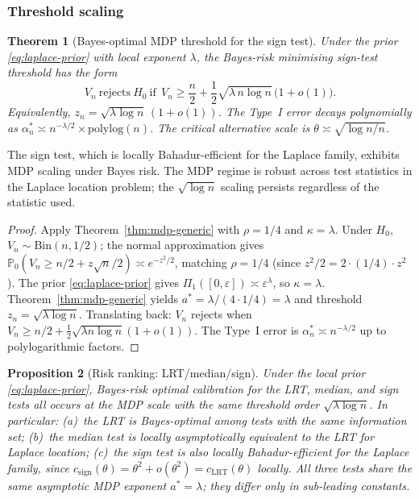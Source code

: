 \documentclass[11pt]{article}
\newcommand{\rhotail}{\rho}  %
\newcommand{\1}{\mathbf{1}}
\newcommand{\PP}{\mathbb{P}}
\theoremstyle{plain}
\newtheorem{theorem}{Theorem}[section]
\newtheorem{proposition}[theorem]{Proposition}
\theoremstyle{definition}
\theoremstyle{remark}
\begin{document}
\subsubsection{Threshold scaling}

\begin{theorem}[Bayes-optimal MDP threshold for the sign test]\label{thm:laplace-sign-threshold}
Under the prior \eqref{eq:laplace-prior} with local exponent $\lambda$, the Bayes-risk minimising sign-test threshold has the form
\begin{equation}\label{eq:laplace-sign-threshold}
  V_n\ \text{rejects}\ H_0\ \text{if}\ \ V_n\ge \frac{n}{2}+\frac{1}{2}\sqrt{\lambda\,n\log n}\,\bigl(1+o(1)\bigr).
\end{equation}
Equivalently, $z_n=\sqrt{\lambda\log n}\,(1+o(1))$.
The Type~I error decays polynomially as $\alpha_n^* \asymp n^{-\lambda/2}\times\mathrm{polylog}(n)$.
The critical alternative scale is $\theta\asymp \sqrt{\log n/n}$.
\end{theorem}

The sign test, which is locally Bahadur-efficient for the Laplace family, exhibits MDP scaling under Bayes risk.
The MDP regime is robust across test statistics in the Laplace location problem; the $\sqrt{\log n}$ scaling persists regardless of the statistic used.

\begin{proof}
Apply Theorem~\ref{thm:mdp-generic} with $\rhotail=1/4$ and $\kappa=\lambda$.
Under $H_0$, $V_n\sim\mathrm{Bin}(n,1/2)$; the normal approximation gives $\PP_0(V_n\ge n/2+z\sqrt{n}/2)\asymp e^{-z^2/2}$, matching $\rhotail=1/4$ (since $z^2/2=2\cdot(1/4)\cdot z^2$).
The prior \eqref{eq:laplace-prior} gives $\Pi_1([0,\varepsilon])\asymp\varepsilon^\lambda$, so $\kappa=\lambda$.
Theorem~\ref{thm:mdp-generic} yields $a^*=\lambda/(4\cdot 1/4)=\lambda$ and threshold $z_n=\sqrt{\lambda\log n}$.
Translating back: $V_n$ rejects when $V_n\ge n/2 + \frac{1}{2}\sqrt{\lambda n\log n}(1+o(1))$.
The Type~I error is $\alpha_n^*\asymp n^{-\lambda/2}$ up to polylogarithmic factors.
\end{proof}

\begin{proposition}[Risk ranking: LRT/median/sign]\label{prop:laplace-efficiency}
Under the local prior \eqref{eq:laplace-prior}, Bayes-risk optimal calibration for the LRT, median, and sign tests all occurs at the MDP scale with the same threshold order $\sqrt{\lambda\log n}$.
In particular: (a)~the LRT is Bayes-optimal among tests with the same information set;
(b)~the median test is locally asymptotically equivalent to the LRT for Laplace location;
(c)~the sign test is also locally Bahadur-efficient for the Laplace family, since $c_{\mathrm{sign}}(\theta) = \theta^2 + o(\theta^2) = c_{\mathrm{LRT}}(\theta)$ locally.
All three tests share the same asymptotic MDP exponent $a^{*}=\lambda$; they differ only in sub-leading constants.
\end{proposition}
\end{document}
